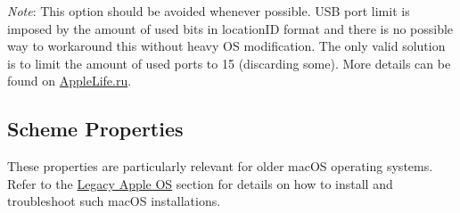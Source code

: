 \documentclass[]{article}
\begin{document}
\begin{enumerate}
  \emph{Note}: This option should be avoided whenever possible. USB port limit
  is imposed by the amount of used bits in locationID format and there is no
  possible way to workaround this without heavy OS modification. The only
  valid solution is to limit the amount of used ports to 15 (discarding some).
  More details can be found on \href{https://applelife.ru/posts/550233}{AppleLife.ru}.

\end{enumerate}

\subsection{Scheme Properties}\label{kernelpropsscheme}

These properties are particularly relevant for older macOS operating systems.
Refer to the \hyperref[legacyapple]{Legacy Apple OS} section for details on how
to install and troubleshoot such macOS installations.
\end{document}

